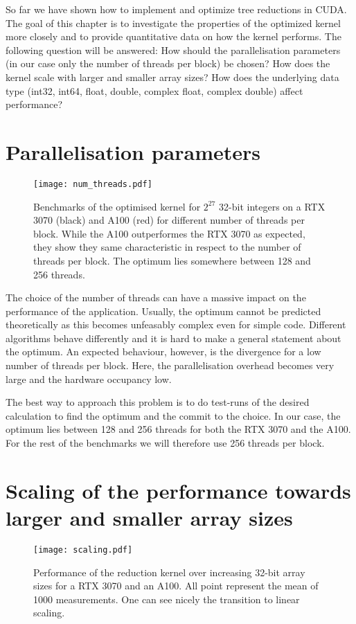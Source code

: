 So far we have shown how to implement and optimize tree reductions in CUDA.
The goal of this chapter is to investigate the properties of the optimized kernel more closely and to provide quantitative data on how the kernel performs. 
The following question will be answered:
How should the parallelisation parameters (in our case only the number of threads per block) be chosen?
How does the kernel scale with larger and smaller array sizes?
How does the underlying data type (int32, int64, float, double, complex float, complex double) affect performance?


\section{Parallelisation parameters}

\begin{figure} \label{fig_num_threads}
    \centering
    \texttt{[image: num\_threads.pdf]}
    \caption{
        Benchmarks of the optimised kernel for \( 2^{27} \) 32-bit integers on a RTX 3070 (black) and A100 (red) for different number of threads per block.
        While the A100 outperformes the RTX 3070 as expected, they show they same characteristic in respect to the number of threads per block.
        The optimum lies somewhere between 128 and 256 threads.
    }
\end{figure}

The choice of the number of threads can have a massive impact on the performance of the application.
Usually, the optimum cannot be predicted theoretically as this becomes unfeasably complex even for simple code.
Different algorithms behave differently and it is hard to make a general statement about the optimum.
An expected behaviour, however, is the divergence for a low number of threads per block.
Here, the parallelisation overhead becomes very large and the hardware occupancy low.

The best way to approach this problem is to do test-runs of the desired calculation to find the optimum and the commit to the choice.
In our case, the optimum lies between 128 and 256 threads for both the RTX 3070 and the A100.
For the rest of the benchmarks we will therefore use 256 threads per block.

\section{Scaling of the performance towards larger and smaller array sizes}

\begin{figure} \label{fig_scaling}
    \centering
    \texttt{[image: scaling.pdf]}
    \caption{
        Performance of the reduction kernel over increasing 32-bit array sizes for a RTX 3070 and an A100.
        All point represent the mean of 1000 measurements.
        One can see nicely the transition to linear scaling.
    }
\end{figure}


